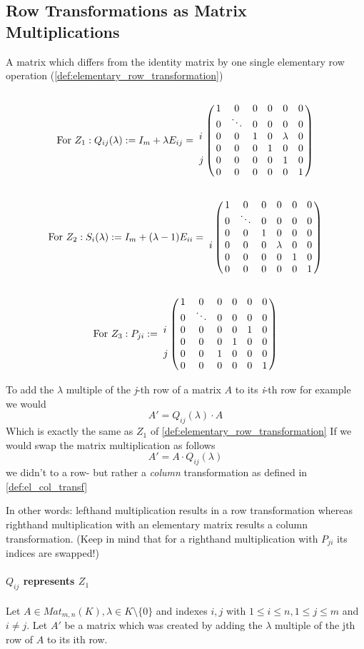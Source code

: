 \subsection{Row Transformations as Matrix Multiplications}
\begin{definition}\label{def:elementary_matrix}
   A matrix which differs from the identity matrix by one single elementary row operation (\ref{def:elementary_row_transformation})
   \[\text{For }Z_1: Q_{ij}(\lambda) := I_m + \lambda E_{ij} = \bordermatrix{
      ~ &   &   &   &   &   &   \cr
        & 1 & 0 & 0 & 0 & 0 & 0 \cr
        & 0 & \ddots & 0 & 0 & 0 & 0 \cr
      i & 0 & 0 & 1 & 0 & \lambda & 0 \cr
        & 0 & 0 & 0 & 1 & 0 & 0 \cr
      j & 0 & 0 & 0 & 0 & 1 & 0 \cr
        & 0 & 0 & 0 & 0 & 0 & 1
   }\]
   \[\text{For }Z_2: S_i(\lambda) := I_m + (\lambda - 1) E_{ii} = \bordermatrix{
      ~ &   &   &   &   &   &   \cr
        & 1 & 0 & 0 & 0 & 0 & 0 \cr
        & 0 & \ddots & 0 & 0 & 0 & 0 \cr
        & 0 & 0 & 1 & 0 & 0 & 0 \cr
      i & 0 & 0 & 0 & \lambda & 0 & 0 \cr
        & 0 & 0 & 0 & 0 & 1 & 0 \cr
        & 0 & 0 & 0 & 0 & 0 & 1
   }\]
   \[\text{For }Z_3: P_{ji} := \bordermatrix{
      ~ &   &   &   &   &   &   \cr
        & 1 & 0 & 0 & 0 & 0 & 0 \cr
        & 0 & \ddots & 0 & 0 & 0 & 0 \cr
      i & 0 & 0 & 0 & 0 & 1 & 0 \cr
        & 0 & 0 & 0 & 1 & 0 & 0 \cr
      j & 0 & 0 & 1 & 0 & 0 & 0 \cr
        & 0 & 0 & 0 & 0 & 0 & 1
   }\]
\end{definition}
\begin{remark}
   To add the \(\lambda\) multiple of the \textit{j}-th row of a matrix \(A\) to its \textit{i}-th row for example we would
   \[A' = Q_{ij}(\lambda) \cdot A\]
   Which is exactly the same as \(Z_1\) of \cref{def:elementary_row_transformation}
   If we would swap the matrix multiplication as follows
   \[A' = A \cdot Q_{ij}(\lambda)\]
   we didn't to a row- but rather a \textit{column} transformation as defined in \cref{def:el_col_transf}

   In other words: lefthand multiplication results in a row transformation whereas righthand multiplication with an elementary matrix results a column transformation. (Keep in mind that for a righthand multiplication with \(P_{ji}\) its indices are swapped!)
\end{remark}

\paragraph{\(Q_{ij}\) represents \(Z_1\)}
Let \(A \in Mat_{m,n}(K), \lambda \in K \setminus \{0\}\) and indexes \(i, j\) with \(1 \leq i \leq n, 1 \leq j \leq m\) and \(i \neq j\).
Let \(A'\) be a matrix which was created by adding the \(\lambda\) multiple of the jth row of \(A\) to its ith row.


